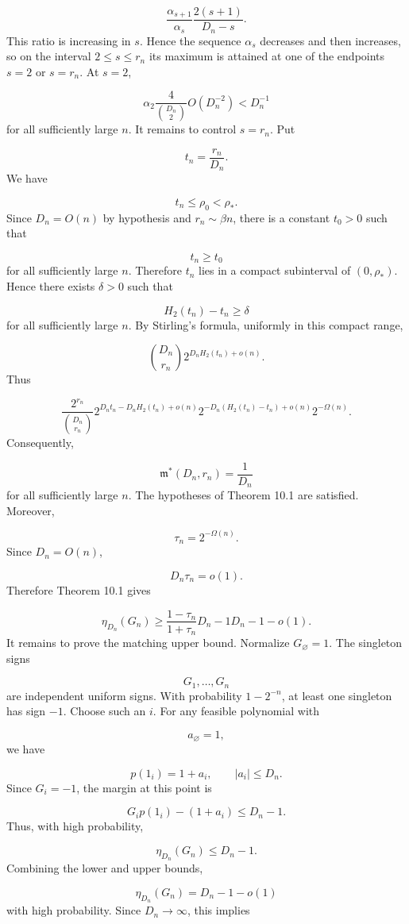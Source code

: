 \documentclass[11pt]{article}
\theoremstyle{definition}
\begin{document}
\[
\frac{\alpha_{s+1}}{\alpha_s}
\frac{2(s+1)}{D_n-s}.
\]
This ratio is increasing in $s$. Hence the sequence $\alpha_s$ decreases and then increases, so on the interval $2\le s\le r_n$ its maximum is attained at one of the endpoints $s=2$ or $s=r_n$. At $s=2$,

\[
\alpha_2
\frac4{\binom{D_n}{2}}
O(D_n^{-2})
<
D_n^{-1}
\]
for all sufficiently large $n$. It remains to control $s=r_n$. Put

\[
t_n=\frac{r_n}{D_n}.
\]
We have

\[
t_n\le \rho_0<\rho_*.
\]
Since $D_n=O(n)$ by hypothesis and $r_n\sim\beta n$, there is a constant $t_0>0$ such that

\[
t_n\ge t_0
\]
for all sufficiently large $n$. Therefore $t_n$ lies in a compact subinterval of $(0,\rho_*)$. Hence there exists $\delta>0$ such that

\[
H_2(t_n)-t_n\ge \delta
\]
for all sufficiently large $n$. By Stirling's formula, uniformly in this compact range,

\[
\binom{D_n}{r_n}
2^{D_nH_2(t_n)+o(n)}.
\]
Thus

\[
\frac{2^{r_n}}{\binom{D_n}{r_n}}
2^{D_nt_n-D_nH_2(t_n)+o(n)}
2^{-D_n(H_2(t_n)-t_n)+o(n)}
2^{-\Omega(n)}.
\]
Consequently,

\[
\mathfrak m^*(D_n,r_n)=\frac1{D_n}
\]
for all sufficiently large $n$. The hypotheses of Theorem 10.1 are satisfied. Moreover,

\[
\tau_n=2^{-\Omega(n)}.
\]
Since $D_n=O(n)$,

\[
D_n\tau_n=o(1).
\]
Therefore Theorem 10.1 gives

\[
\eta_{D_n}(G_n)
\ge
\frac{1-\tau_n}{1+\tau_n}D_n-1
D_n-1-o(1).
\]
It remains to prove the matching upper bound. Normalize $G_\varnothing=1$. The singleton signs

\[
G_{{1}},\dots,G_{{n}}
\]
are independent uniform signs. With probability $1-2^{-n}$, at least one singleton has sign $-1$. Choose such an $i$. For any feasible polynomial with

\[
a_\varnothing=1,
\]
we have

\[
p(1_{{i}})=1+a_{{i}},
\qquad
|a_{{i}}|\le D_n.
\]
Since $G_{{i}}=-1$, the margin at this point is

\[
G_{{i}}p(1_{{i}})
-(1+a_{{i}})
\le
D_n-1.
\]
Thus, with high probability,

\[
\eta_{D_n}(G_n)\le D_n-1.
\]
Combining the lower and upper bounds,

\[
\eta_{D_n}(G_n)=D_n-1-o(1)
\]
with high probability. Since $D_n\to\infty$, this implies
\end{document}
